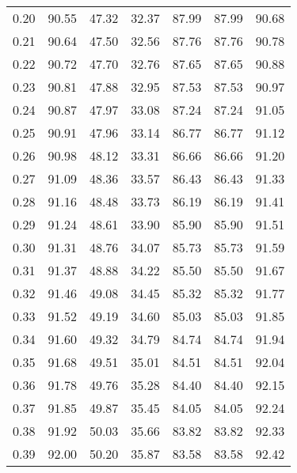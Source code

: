 \begin{tabular}{|c|c|c|c|c|c|c|}
      0.20 &     90.55 &     47.32 &      32.37 &   87.99 &      87.99 &         90.68 \\
      0.21 &     90.64 &     47.50 &      32.56 &   87.76 &      87.76 &         90.78 \\
      0.22 &     90.72 &     47.70 &      32.76 &   87.65 &      87.65 &         90.88 \\
      0.23 &     90.81 &     47.88 &      32.95 &   87.53 &      87.53 &         90.97 \\
      0.24 &     90.87 &     47.97 &      33.08 &   87.24 &      87.24 &         91.05 \\
      0.25 &     90.91 &     47.96 &      33.14 &   86.77 &      86.77 &         91.12 \\
      0.26 &     90.98 &     48.12 &      33.31 &   86.66 &      86.66 &         91.20 \\
      0.27 &     91.09 &     48.36 &      33.57 &   86.43 &      86.43 &         91.33 \\
      0.28 &     91.16 &     48.48 &      33.73 &   86.19 &      86.19 &         91.41 \\
      0.29 &     91.24 &     48.61 &      33.90 &   85.90 &      85.90 &         91.51 \\
      0.30 &     91.31 &     48.76 &      34.07 &   85.73 &      85.73 &         91.59 \\
      0.31 &     91.37 &     48.88 &      34.22 &   85.50 &      85.50 &         91.67 \\
      0.32 &     91.46 &     49.08 &      34.45 &   85.32 &      85.32 &         91.77 \\
      0.33 &     91.52 &     49.19 &      34.60 &   85.03 &      85.03 &         91.85 \\
      0.34 &     91.60 &     49.32 &      34.79 &   84.74 &      84.74 &         91.94 \\
      0.35 &     91.68 &     49.51 &      35.01 &   84.51 &      84.51 &         92.04 \\
      0.36 &     91.78 &     49.76 &      35.28 &   84.40 &      84.40 &         92.15 \\
      0.37 &     91.85 &     49.87 &      35.45 &   84.05 &      84.05 &         92.24 \\
      0.38 &     91.92 &     50.03 &      35.66 &   83.82 &      83.82 &         92.33 \\
      0.39 &     92.00 &     50.20 &      35.87 &   83.58 &      83.58 &         92.42 \\

\end{tabular}
